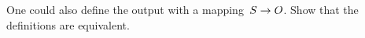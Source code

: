 One could also define the output with a mapping~$S\rightarrow\nobreak
O$. Show that the definitions are equivalent.
